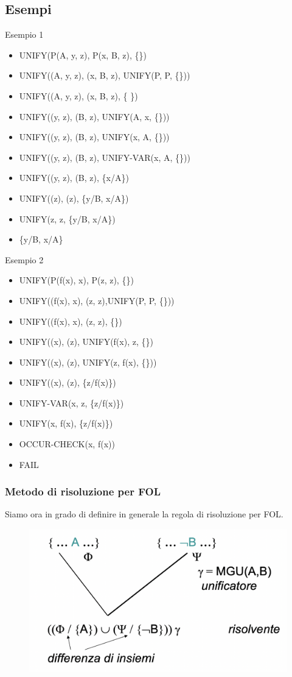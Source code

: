 \documentclass{article}
\begin{document}
\subsection{Esempi}
Esempio 1
\begin{itemize}
    \item UNIFY(P(A, y, z), P(x, B, z), \{\})
    \item UNIFY((A, y, z), (x, B, z), UNIFY(P, P, \{\}))
    \item UNIFY((A, y, z), (x, B, z), \{ \})
    \item UNIFY((y, z), (B, z), UNIFY(A, x, \{\}))
    \item UNIFY((y, z), (B, z), UNIFY(x, A, \{\}))
    \item UNIFY((y, z), (B, z), UNIFY-VAR(x, A, \{\}))
    \item UNIFY((y, z), (B, z), \{x/A\})
    \item UNIFY((z), (z), \{y/B, x/A\})
    \item UNIFY(z, z, \{y/B, x/A\})
    \item \{y/B, x/A\}	
\end{itemize}
\clearpage
Esempio 2
\begin{itemize}
    \item UNIFY(P(f(x), x), P(z, z), \{\})
    \item UNIFY((f(x), x), (z, z),UNIFY(P, P, \{\}))
    \item UNIFY((f(x), x), (z, z), \{\})
    \item UNIFY((x), (z), UNIFY(f(x), z, \{\})
    \item UNIFY((x), (z), UNIFY(z, f(x), \{\}))
    \item UNIFY((x), (z), \{z/f(x)\})
    \item UNIFY-VAR(x, z, \{z/f(x)\})
    \item UNIFY(x, f(x), \{z/f(x)\})
    \item OCCUR-CHECK(x, f(x))
    \item FAIL
\end{itemize}

\subsubsection{Metodo di risoluzione per FOL}
Siamo ora in grado di definire in generale la regola di risoluzione per FOL. \newline
\begin{figure}[h!]
\centering
\includegraphics[scale=0.3]{Images/FOLresolmethod.png}
\end{figure}
\end{document}
